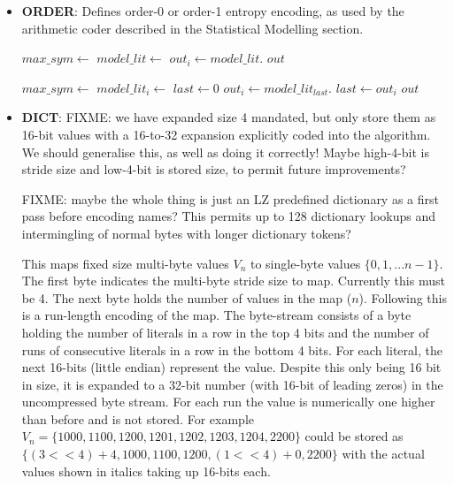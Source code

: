\documentclass[a4paper]{article}
\begin{document}
\begin{itemize}
\item{\textbf{ORDER}:}
Defines order-0 or order-1 entropy encoding, as used by the arithmetic
coder described in the Statistical Modelling section.

\begin{algorithmic}[1]
  \State $max\_sym \gets $
  \State $model\_lit \gets $
  \Statex
    \State $out_i \gets model\_lit.$
  \EndFor
  \State \Return $out$
\EndFunction
\end{algorithmic}

\begin{algorithmic}[1]
  \State $max\_sym \gets $
    \State $model\_lit_i \gets $
  \EndFor
  \Statex
  \State $last \gets 0$
    \State $out_i \gets model\_lit_{last}.$
    \State $last \gets out_i$
  \EndFor
  \State \Return $out$
\EndFunction
\end{algorithmic}

\item{\textbf{DICT}:}
FIXME: we have expanded size 4 mandated, but only store them as 16-bit
values with a 16-to-32 expansion explicitly coded into the algorithm.
We should generalise this, as well as doing it correctly! Maybe
high-4-bit is stride size and low-4-bit is stored size, to permit
future improvements?

FIXME: maybe the whole thing is just an LZ predefined dictionary as a
first pass before encoding names?  This permits up to 128 dictionary
lookups and intermingling of normal bytes with longer dictionary tokens?

This maps fixed size multi-byte values $V_n$ to single-byte values
$\{0, 1, ... n-1\}$.  The first byte indicates the multi-byte stride
size to map.  Currently this must be 4.  The next byte holds the
number of values in the map ($n$). Following this is a run-length
encoding of the map.  The byte-stream consists of a byte holding the
number of literals in a row in the top 4 bits and the number of runs
of consecutive literals in a row in the bottom 4 bits.  For each
literal, the next 16-bits (little endian) represent the value.
Despite this only being 16 bit in size, it is expanded to a 32-bit
number (with 16-bit of leading zeros) in the uncompressed byte stream.
For each run the value is numerically one higher than before and is
not stored.  For example $V_n =
\{1000,1100,1200,1201,1202,1203,1204,2200\}$ could be stored as
$\{(3<<4)+4, \textit{1000}, \textit{1100}, \textit{1200}, (1<<4)+0, \textit{2200}\}$ with the actual
values shown in italics taking up 16-bits each.


\end{itemize}
\end{document}
